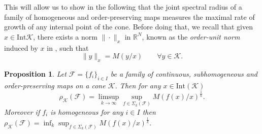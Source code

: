 \documentclass{article}
\newtheorem{proposition}[theorem]{Proposition}
\newcommand{\R}{\mathbb{R}}
\newcommand{\family}{\mathcal{F}}
\newcommand{\cradius}{\rho_{\cone}}
\newcommand{\cone}{\mathcal{K}}
\newcommand{\interior}{\mathrm{Int}}
\begin{document}
This will allow us to show in the following that the joint spectral radius of a family of homogeneous and order-preserving maps measures the maximal rate of growth of any internal point of the cone.
%
Before doing that, we recall that given $x\in \interior{\cone}$, there exists a norm $\|\cdot\|_x$ in $\R^N$, known as the \textit{order-unit norm} induced by $x$ in \cite{lemmens2012nonlinear}, such that 
\begin{equation}\label{order_unit_norm}
    \|y\|_x=M(y/x)  \qquad \forall y\in \cone.   
\end{equation}
%
\begin{proposition}\label{Prop_family_Power_method_characterizes_JSR}
    Let $\family=\{f_i\}_{i\in I}$ be a family of continuous, subhomogeneous and order-preserving maps on a cone $\cone$. Then for any $x\in \interior(\cone)$
    $$\cradius(\family)=\limsup_{k\rightarrow \infty}\sup_{f\in \Sigma_k(\family)}M(f(x)/x)^{\frac{1}{k}}.$$
Moreover if $f_{i}$ is homogeneous for any $i\in I$ then $\cradius(\family)=\inf_{k}\sup_{f\in \Sigma_k(\family)}M(f(x)/x)^{\frac{1}{k}}.$
\end{proposition}
%
%
\end{document}
